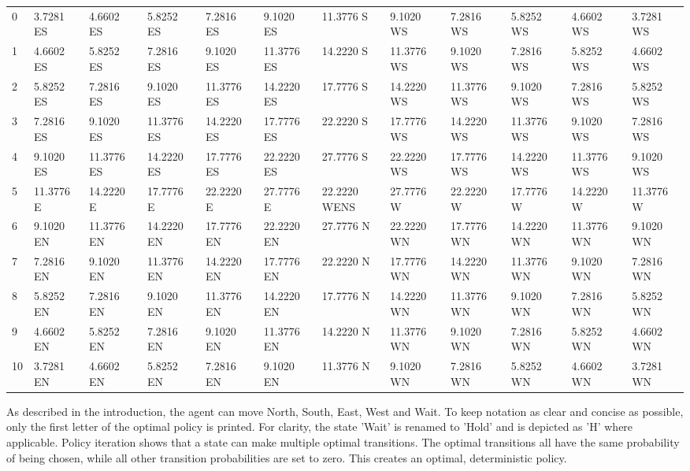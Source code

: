 \documentclass{article}
\begin{document}
\begin{center}
{\begin{tabular}{ |l | l | l | l | l | l | l | l | l | l | l | l|}
\hline
0 & 3.7281  ES &  4.6602  ES &  5.8252  ES &  7.2816  ES &  9.1020  ES &  11.3776  S &  9.1020  WS &  7.2816  WS &  5.8252  WS &  4.6602  WS &  3.7281  WS  \\
1 & 4.6602  ES &  5.8252  ES &  7.2816  ES &  9.1020  ES &  11.3776  ES &  14.2220  S &  11.3776  WS &  9.1020  WS &  7.2816  WS &  5.8252  WS &  4.6602  WS  \\
2 & 5.8252  ES &  7.2816  ES &  9.1020  ES &  11.3776  ES &  14.2220  ES &  17.7776  S &  14.2220  WS &  11.3776  WS &  9.1020  WS &  7.2816  WS &  5.8252  WS  \\
3 & 7.2816  ES &  9.1020  ES &  11.3776  ES &  14.2220  ES &  17.7776  ES &  22.2220  S &  17.7776  WS &  14.2220  WS &  11.3776  WS &  9.1020  WS &  7.2816  WS  \\
4 & 9.1020  ES &  11.3776  ES &  14.2220  ES &  17.7776  ES &  22.2220  ES &  27.7776  S &  22.2220  WS &  17.7776  WS &  14.2220  WS &  11.3776  WS &  9.1020  WS  \\
5 & 11.3776  E &  14.2220  E &  17.7776  E &  22.2220  E &  27.7776  E &  \cellcolor{red!40}22.2220  WENS &  27.7776  W &  22.2220  W &  17.7776  W &  14.2220  W &  11.3776  W  \\
6 & 9.1020  EN &  11.3776  EN &  14.2220  EN &  17.7776  EN &  22.2220  EN &  27.7776  N &  22.2220  WN &  17.7776  WN &  14.2220  WN &  11.3776  WN &  9.1020  WN  \\
7 & 7.2816  EN &  9.1020  EN &  11.3776  EN &  14.2220  EN &  17.7776  EN &  22.2220  N &  17.7776  WN &  14.2220  WN &  11.3776  WN &  9.1020  WN &  7.2816  WN  \\
8 & 5.8252  EN &  7.2816  EN &  9.1020  EN &  11.3776  EN &  14.2220  EN &  17.7776  N &  14.2220  WN &  11.3776  WN &  9.1020  WN &  7.2816  WN &  5.8252  WN  \\
9 & 4.6602  EN &  5.8252  EN &  7.2816  EN &  9.1020  EN &  11.3776  EN &  14.2220  N &  11.3776  WN &  9.1020  WN &  7.2816  WN &  5.8252  WN &  4.6602  WN  \\
10 & 3.7281  EN &  4.6602  EN &  5.8252  EN &  7.2816  EN &  9.1020  EN &  11.3776  N &  9.1020  WN &  7.2816  WN &  5.8252  WN &  4.6602  WN &  3.7281  WN  \\
	\end{tabular}
	}
\end{center}

As described in the introduction, the agent can move North, South, East, West and Wait. To keep notation as clear and concise as possible, only the first letter of the optimal policy is printed. For clarity, the state 'Wait' is renamed to 'Hold' and is depicted as 'H' where applicable. 
Policy iteration shows that a state can make multiple optimal transitions. The optimal transitions all have the same probability of being chosen, while all other transition probabilities are set to zero. This creates an optimal, deterministic policy.
\end{document}
